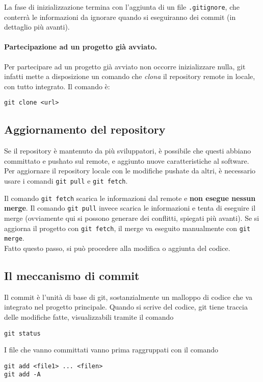 \documentclass[a4paper, 11pt]{article}
\begin{document}
	La fase di inizializzazione termina con l'aggiunta di un file \lstinline|.gitignore|, che conterrà le informazioni da ignorare quando si eseguiranno dei commit (in dettaglio più avanti).
	
	\paragraph{Partecipazione ad un progetto già avviato.}
	Per partecipare ad un progetto già avviato non occorre inizializzare nulla, git infatti mette a disposizione un comando che \emph{clona} il repository remote in locale, con tutto integrato. Il comando è: \begin{lstlisting}
git clone <url>
	\end{lstlisting}
	
	\subsection{Aggiornamento del repository}
	Se il repository è mantenuto da più sviluppatori, è possibile che questi abbiano committato e pushato sul remote, e aggiunto nuove caratteristiche al software. Per aggiornare il repository locale con le modifiche pushate da altri, è necessario usare i comandi \lstinline|git pull| e \lstinline|git fetch|.
	
	Il comando \lstinline|git fetch| scarica le informazioni dal remote e \textbf{non esegue nessun merge}. Il comando \lstinline|git pull| invece scarica le informazioni e tenta di eseguire il merge (ovviamente qui si possono generare dei conflitti, spiegati più avanti). Se si aggiorna il progetto con \lstinline|git fetch|, il merge va eseguito manualmente con \lstinline|git merge|. \\
	
	\noindent
	Fatto questo passo, si può procedere alla modifica o aggiunta del codice.
	
	\subsection{Il meccanismo di commit}
	Il commit è l'unità di base di git, sostanzialmente un malloppo di codice che va integrato nel progetto principale. Quando si scrive del codice, git tiene traccia delle modifiche fatte, visualizzabili tramite il comando \begin{lstlisting}
git status
	\end{lstlisting}
	I file che vanno committati vanno prima raggruppati con il comando \begin{lstlisting}
git add <file1> ... <filen>
git add -A
	\end{lstlisting}
	
\end{document}
